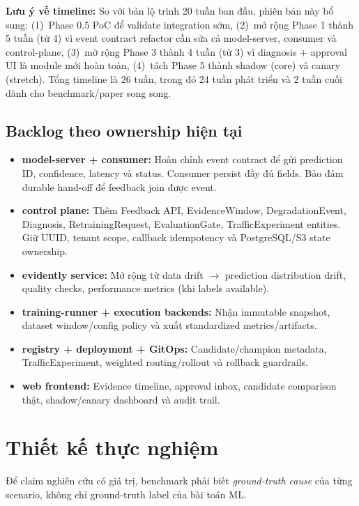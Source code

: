\documentclass[11pt,a4paper]{article}
\begin{document}
\textbf{Lưu ý về timeline:} So với bản lộ trình 20 tuần ban đầu, phiên bản này bổ sung: (1)~Phase 0.5 PoC để validate integration sớm, (2)~mở rộng Phase 1 thành 5 tuần (từ 4) vì event contract refactor cần sửa cả model-server, consumer và control-plane, (3)~mở rộng Phase 3 thành 4 tuần (từ 3) vì diagnosis + approval UI là module mới hoàn toàn, (4)~tách Phase 5 thành shadow (core) và canary (stretch). Tổng timeline là 26 tuần, trong đó 24 tuần phát triển và 2 tuần cuối dành cho benchmark/paper song song.

\subsection{Backlog theo ownership hiện tại}
\begin{itemize}
  \item \textbf{model-server + consumer:} Hoàn chỉnh event contract để gửi prediction ID, confidence, latency và status. Consumer persist đầy đủ fields. Bảo đảm durable hand-off để feedback join được event.
  \item \textbf{control plane:} Thêm Feedback API, EvidenceWindow, DegradationEvent, Diagnosis, RetrainingRequest, EvaluationGate, TrafficExperiment entities. Giữ UUID, tenant scope, callback idempotency và PostgreSQL/S3 state ownership.
  \item \textbf{evidently service:} Mở rộng từ data drift $\rightarrow$ prediction distribution drift, quality checks, performance metrics (khi labels available).
  \item \textbf{training-runner + execution backends:} Nhận immutable snapshot, dataset window/config policy và xuất standardized metrics/artifacts.
  \item \textbf{registry + deployment + GitOps:} Candidate/champion metadata, TrafficExperiment, weighted routing/rollout và rollback guardrails.
  \item \textbf{web frontend:} Evidence timeline, approval inbox, candidate comparison thật, shadow/canary dashboard và audit trail.
\end{itemize}

\section{Thiết kế thực nghiệm}

Để claim nghiên cứu có giá trị, benchmark phải biết \emph{ground-truth cause} của từng scenario, không chỉ ground-truth label của bài toán ML.
\end{document}

